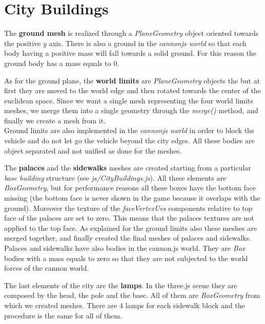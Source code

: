 \documentclass[a4paper, 11pt, titlepage]{report}
\begin{document}
	\section{City Buildings}
		\par The \textbf{ground mesh} is realized through a \emph{PlaneGeometry} object oriented towards the positive $y$ axis. There is also a ground in the \emph{cannonjs world} so that each body having a positive mass will fall towards a solid ground. For this reason the ground body has a mass equals to $0$.
		\par As for the ground plane, the \textbf{world limits} are \emph{PlaneGeometry} objects the but at first they are moved to the world edge and then rotated towards the center of the euclidean space. Since we want a single mesh representing the four world limits meshes, we merge them into a single geometry through the \emph{merge()} method, and finally we create a mesh from it. \\
		Ground limits are also implemented in the \emph{cannonjs world} in order to block the vehicle and do not let go the vehicle beyond the city edges. All these bodies are object separated and not unified as done for the meshes.
		\par The \textbf{palaces} and the \textbf{sidewalks} meshes are created starting from a particular \emph{base building} structure (see \emph{js/CityBuildings.js}). All these elements are \emph{BoxGeometry}, but for performance reasons all these boxes have the bottom face missing (the bottom face is never shown in the game because it overlaps with the ground). Moreover the texture of the \emph{faceVertexUvs} components relative to top face of the palaces are set to zero. This means that the palaces textures are not applied to the top face. As explained for the ground limits also these meshes are merged together, and finally created the final meshes of palaces and sidewalks.\\
		Palaces and sidewalks have also bodies in the cannon.js world. They are \emph{Box} bodies 
		with a mass equals to zero so that they are not subjected to the world forces of the cannon world.
		\par The last elements of the city are the \textbf{lamps}. In the three.js scene they are composed by the head, the pole and the base. All of them are \emph{BoxGeometry} from which we created meshes. There are 4 lamps for each sidewalk block and the procedure is the same for all of them.

\end{document}
